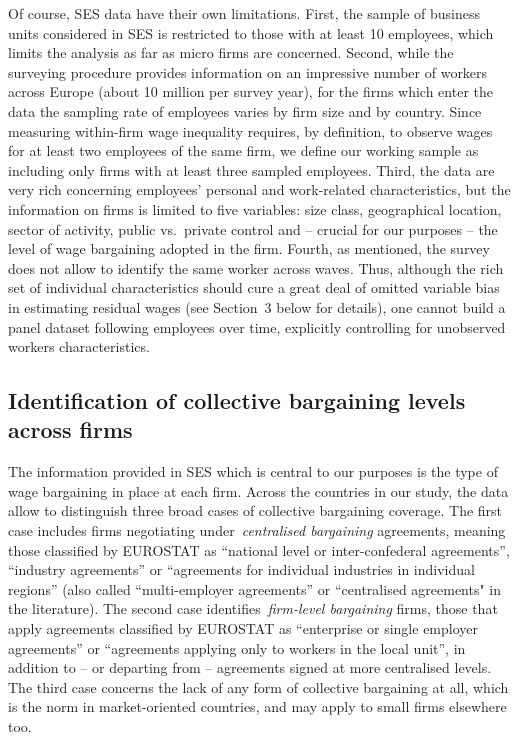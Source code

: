 \documentclass[12pt]{article}
\begin{document}
Of course, SES data have their own limitations. First, the sample of business units considered in SES is restricted to those with at least 10 employees, which limits the analysis as far as micro firms are concerned. Second, while the surveying procedure provides information on an impressive number of workers across Europe (about 10 million per survey year), for the firms which enter the data the sampling rate of employees varies by firm size and by country. Since measuring within-firm wage inequality requires, by definition, to observe wages for at least two employees of the same firm, we define our working sample as including only firms with at least three sampled employees. Third, the data are very rich concerning employees' personal and work-related characteristics, but the information on firms is limited to five variables: size class, geographical location, sector of activity, public vs.\ private control and -- crucial for our purposes -- the level of wage bargaining adopted in the firm. Fourth, as mentioned, the survey does not allow to identify the same worker across waves. Thus, although the rich set of individual characteristics should cure a great deal of omitted variable bias in estimating residual wages (see Section~3 below for details), one cannot build a panel dataset following employees over time, explicitly controlling for unobserved workers characteristics. 


\subsection{Identification of collective bargaining levels across firms}
\label{sec:decentralisation}
The information provided in SES which is central to our purposes is the type of wage bargaining in place at each firm. Across the countries in our study, the data allow to distinguish three broad cases of collective bargaining coverage. The first case includes firms negotiating under~\emph{centralised bargaining} agreements, meaning those classified by EUROSTAT as “national level or inter-confederal agreements”, “industry agreements” or “agreements for individual industries in individual regions” (also called “multi-employer agreements” or “centralised agreements" in the literature). The second case identifies~\emph{firm-level bargaining} firms, those that apply agreements classified by EUROSTAT as “enterprise or single employer agreements” or “agreements applying only to workers in the local unit”, in addition to -- or departing from -- agreements signed at more centralised levels. The third case concerns the lack of any form of collective bargaining at all, which is the norm in market-oriented countries, and may apply to small firms elsewhere too.
\end{document}
